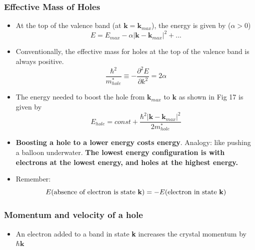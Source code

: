 \documentclass[10pt]{article}
\begin{document}
\subsubsection{Effective Mass of Holes}
  \begin{itemize}
    \item At the top of the valence band (at $\textbf{k} = \textbf{k}_{max}$), the energy is given by ($\alpha > 0$)
    $$
    E = E_{max} - \alpha|\textbf{k} - \textbf{k}_{max}|^{2} + ...
    $$
    \item Conventionally, the effective mass for holes at the top of the valence band is always positive.
    $$
    \frac{\hbar^{2}}{m^{*}_{hole}} \equiv -\frac{\partial^{2}E}{\partial k^{2}} = 2\alpha
    $$
    \item The energy needed to boost the hole from $\textbf{k}_{max}$ to $\textbf{k}$ as shown in Fig 17 is given by
    $$
      E_{hole} = const + \frac{\hbar^{2}|\textbf{k} - \textbf{k}_{max}|^{2}}{2m^{*}_{hole}}
    $$
    \item \textbf{Boosting a hole to a lower energy costs energy}. Analogy: like pushing a balloon underwater. \textbf{
    The lowest energy configuration is with electrons at the lowest energy, and holes at the highest energy.
    }
    \item Remember:
    \begin{equation}
      E(\text{absence of electron is state \textbf{k}}) = -E(\text{electron in state \textbf{k}})
    \end{equation}
\end{itemize}

\subsubsection{Momentum and velocity of a hole}
\begin{itemize}
  \item An electron added to a band in state \textbf{k} increases the crystal momentum by $\hbar\textbf{k}$
\end{itemize}
\end{document}
